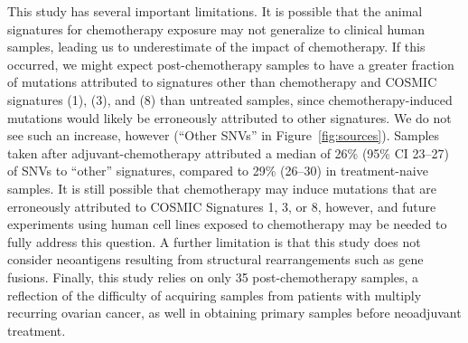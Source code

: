 This study has several important limitations. It is possible that the animal signatures for chemotherapy exposure may not generalize to clinical human samples, leading us to underestimate of the impact of chemotherapy. If this occurred, we might expect post-chemotherapy samples to have a greater fraction of mutations attributed to signatures other than chemotherapy and COSMIC signatures (1), (3), and (8) than untreated samples, since chemotherapy-induced mutations would likely be erroneously attributed to other signatures. We do not see such an increase, however (``Other SNVs'' in Figure~\ref{fig:sources}). Samples taken after adjuvant-chemotherapy attributed a median of 26\% (95\% CI 23--27) of SNVs to ``other'' signatures, compared to 29\% (26--30) in treatment-naive samples. It is still possible that chemotherapy may induce mutations that are erroneously attributed to COSMIC Signatures 1, 3, or 8, however, and future experiments using human cell lines exposed to chemotherapy may be needed to fully address this question. A further limitation is that this study does not consider neoantigens resulting from structural rearrangements such as gene fusions. Finally, this study relies on only 35 post-chemotherapy samples, a reflection of the difficulty of acquiring samples from patients with multiply recurring ovarian cancer, as well in obtaining primary samples before neoadjuvant treatment.


